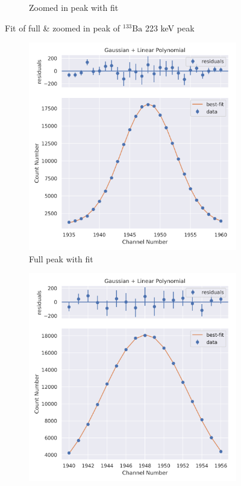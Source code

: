 \documentclass[11pt,a4paper]{article}
\newcommand{\element}[2]{$^{#2}\textrm{#1}$}
\begin{document}
\begin{figure}[H]
\begin{subfigure}{.5\linewidth}
    \caption{Zoomed in peak with fit}
  \end{subfigure}
  \caption{Fit of full \& zoomed in peak of \element{Ba}{133} 223 keV peak}
\end{figure}
\begin{figure}[H]
  \centering
  \begin{subfigure}{.5\linewidth}
    \centering
    \includegraphics[width=\linewidth]{./Images/Barium133/Linear/Linear_4_Full.png}
    \caption{Full peak with fit}
  \end{subfigure}%
  \begin{subfigure}{.5\linewidth}
    \centering
    \includegraphics[width=\linewidth]{./Images/Barium133/Linear/Linear_4_Zoom.png}

\end{subfigure}
\end{figure}
\end{document}
